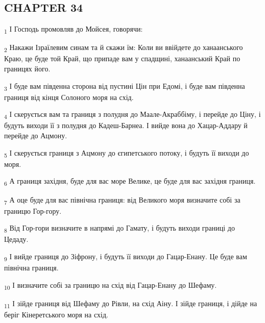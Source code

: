 \subsection{CHAPTER 34}
\begin{tcolorbox}
\textsubscript{1} І Господь промовляв до Мойсея, говорячи:
\end{tcolorbox}
\begin{tcolorbox}
\textsubscript{2} Накажи Ізраїлевим синам та й скажи їм: Коли ви ввійдете до ханаанського Краю, це буде той Край, що припаде вам у спадщині, ханаанський Край по границях його.
\end{tcolorbox}
\begin{tcolorbox}
\textsubscript{3} І буде вам південна сторона від пустині Цін при Едомі, і буде вам південна границя від кінця Солоного моря на схід.
\end{tcolorbox}
\begin{tcolorbox}
\textsubscript{4} І скерується вам та границя з полудня до Маале-Акраббіму, і перейде до Ціну, і будуть виходи її з полудня до Кадеш-Барнеа. І вийде вона до Хацар-Аддару й перейде до Ацмону.
\end{tcolorbox}
\begin{tcolorbox}
\textsubscript{5} І скерується границя з Ацмону до єгипетського потоку, і будуть її виходи до моря.
\end{tcolorbox}
\begin{tcolorbox}
\textsubscript{6} А границя західня, буде для вас море Велике, це буде для вас західня границя.
\end{tcolorbox}
\begin{tcolorbox}
\textsubscript{7} А оце буде для вас північна границя: від Великого моря визначите собі за границю Гор-гору.
\end{tcolorbox}
\begin{tcolorbox}
\textsubscript{8} Від Гор-гори визначите в напрямі до Гамату, і будуть виходи границі до Цедаду.
\end{tcolorbox}
\begin{tcolorbox}
\textsubscript{9} І вийде границя до Зіфрону, і будуть її виходи до Гацар-Енану. Це буде вам північна границя.
\end{tcolorbox}
\begin{tcolorbox}
\textsubscript{10} І визначите собі за границю на схід від Гацар-Енану до Шефаму.
\end{tcolorbox}
\begin{tcolorbox}
\textsubscript{11} І зійде границя від Шефаму до Рівли, на схід Аіну. І зійде границя, і дійде на беріг Кінеретського моря на схід.
\end{tcolorbox}
